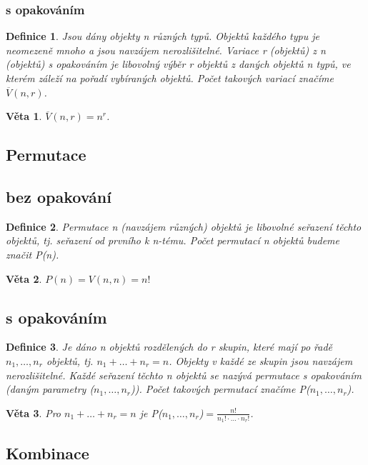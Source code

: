 \documentclass[12pt,a4paper]{article}
\newtheorem{definition}{Definice}
\newtheorem{sentence}{Věta}
\begin{document}
\subsubsection{s opakováním}
\begin{definition}
	Jsou dány objekty n různých typů. Objektů každého typu je neomezeně mnoho a jsou navzájem nerozlišitelné. Variace r (objektů) z n (objektů) s opakováním je libovolný výběr r objektů z daných objektů n typů, ve kterém záleží na pořadí vybíraných objektů. Počet takových variací značíme $\overline{V}(n, r)$.	
\end{definition}
\begin{sentence}
	$\overline{V}(n, r) = n^r$.
\end{sentence}

\subsection{Permutace}
\subsection{bez opakování}
\begin{definition}
	Permutace n (navzájem různých) objektů je libovolné seřazení těchto objektů, tj. seřazení od prvního k n-tému. Počet permutací n objektů budeme značit P(n).
\end{definition}
\begin{sentence}
	$P(n) = V(n, n) = n!$
\end{sentence}

\subsection{s opakováním}
\begin{definition}
	Je dáno n objektů rozdělených do r skupin, které mají po řadě $n_1, \dots,n_r$ objektů, tj. $n_1 + \dots + n_r = n$. Objekty v každé ze skupin jsou navzájem nerozlišitelné. Každé seřazení těchto n objektů se nazývá permutace s opakováním (daným parametry ($n_1, \dots, n_r$)). Počet takových permutací značíme P($n_1, \dots, n_r$).
\end{definition}
\begin{sentence}
	Pro $n_1 + \dots + n_r = n$ je P($n_1, \dots, n_r$)$ = \frac{n!}{n_1! \cdot \dots \cdot n_r!}$.
\end{sentence}

\subsection{Kombinace}
\end{document}
